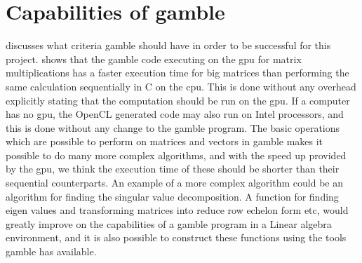 \section{Capabilities of \gls{gamble}}
 discusses what criteria \gls{gamble} should have in order to be successful for this project.
 shows that the gamble code executing on the \acrshort{gpu} for matrix multiplications has a faster execution time for big matrices than performing the same calculation sequentially in C on the \acrshort{cpu}.
This is done without any overhead explicitly stating that the computation should be run on the \acrshort{gpu}.
If a computer has no \acrshort{gpu}, the OpenCL generated code may also run on Intel processors, and this is done without any change to the \gls{gamble} program.
The basic operations which are possible to perform on matrices and vectors in \gls{gamble} makes it possible to do many more complex algorithms, and with the speed up provided by the \acrshort{gpu}, we think the execution time of these should be shorter than their sequential counterparts.
An example of a more complex algorithm could be an algorithm for finding the singular value decomposition.
A function for finding eigen values and transforming matrices into reduce row echelon form etc, would greatly improve on the capabilities of a \gls{gamble} program in a Linear algebra environment, and it is also possible to construct these functions using the tools \gls{gamble} has available.